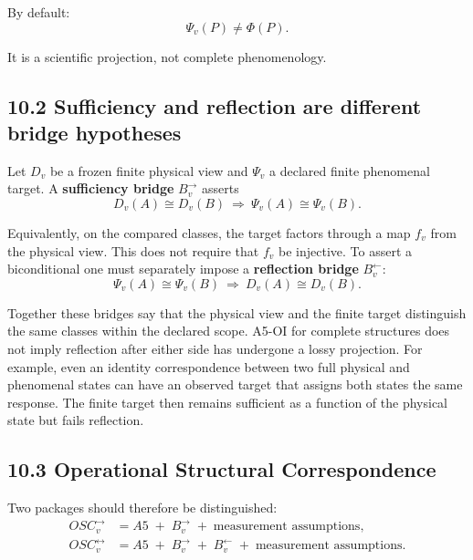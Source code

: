 \documentclass[
  11pt,
  a4paper,
]{article}
\begin{document}
By default:
\nopagebreak[4]
\[
\boxed{
\Psi_v(P)
\neq
\Phi(P).
}
\]

It is a scientific projection, not complete phenomenology.

\hypertarget{sufficiency-and-reflection-are-different-bridge-hypotheses}{%
\subsection{10.2 Sufficiency and reflection are different bridge
hypotheses}\label{sufficiency-and-reflection-are-different-bridge-hypotheses}}

Let \(D_v\) be a frozen finite physical view and \(\Psi_v\) a declared
finite phenomenal target. A \textbf{sufficiency bridge} \(B_v^{\to}\)
asserts
\nopagebreak[4]
\[
D_v(A)\cong D_v(B)
\ \Longrightarrow\ \Psi_v(A)\cong\Psi_v(B).
\]

Equivalently, on the compared classes, the target factors through a map
\(f_v\) from the physical view. This does not require that \(f_v\) be
injective. To assert a biconditional one must separately impose a
\textbf{reflection bridge} \(B_v^{\leftarrow}\):
\nopagebreak[4]
\[
\Psi_v(A)\cong\Psi_v(B)
\ \Longrightarrow\ D_v(A)\cong D_v(B).
\]

Together these bridges say that the physical view and the finite target
distinguish the same classes within the declared scope. A5-OI for
complete structures does not imply reflection after either side has
undergone a lossy projection. For example, even an identity
correspondence between two full physical and phenomenal states can have
an observed target that assigns both states the same response. The
finite target then remains sufficient as a function of the physical
state but fails reflection.

\hypertarget{operational-structural-correspondence}{%
\subsection{10.3 Operational Structural
Correspondence}\label{operational-structural-correspondence}}

Two packages should therefore be distinguished:
\nopagebreak[4]
\[
\begin{aligned}
OSC_v^{\to}&=A5\;+\;B_v^{\to}\;+\;\text{measurement assumptions},\\
OSC_v^{\leftrightarrow}&=A5\;+\;B_v^{\to}\;+\;B_v^{\leftarrow}
\;+\;\text{measurement assumptions}.
\end{aligned}
\]
\end{document}

